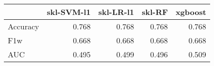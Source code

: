 \begin{tabular}{lrrrr}
\toprule
{} &  skl-SVM-l1 &  skl-LR-l1 &  skl-RF &  xgboost \\
\midrule
Accuracy &       0.768 &      0.768 &   0.768 &    0.768 \\
F1w      &       0.668 &      0.668 &   0.668 &    0.668 \\
AUC      &       0.495 &      0.499 &   0.496 &    0.509 \\
\bottomrule
\end{tabular}
